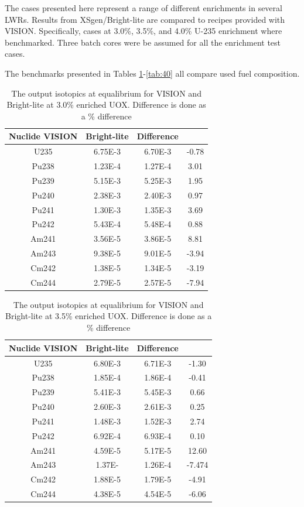 \documentclass{article}
\begin{document}
The cases presented here represent a range of different enrichments in several LWRs.
Results from XSgen/Bright-lite are compared to recipes provided with VISION\cite{vision}.
Specifically, cases at 3.0\%, 3.5\%, and 4.0\% U-235 enrichment where benchmarked.
Three batch cores were be assumed for all the enrichment test cases.

The benchmarks presented in Tables \ref{tab:30}-\ref{tab:40}
all compare used fuel composition. 

\begin{table}[!htb]
\centering
\small
\caption{The output isotopics at equalibrium for VISION and Bright-lite at 3.0\% enriched UOX. Difference is done as a \% difference}
\label{tab:30}
\vspace{0.5em}
\begin{tabular}{cccc}
Nuclide  VISION & Bright-lite & Difference \\
\hline
U235  & 6.75E-3 & 6.70E-3 & -0.78\\
Pu238 & 1.23E-4 & 1.27E-4 & 3.01\\
Pu239 & 5.15E-3 & 5.25E-3 & 1.95\\
Pu240 & 2.38E-3 & 2.40E-3 & 0.97\\
Pu241 & 1.30E-3 & 1.35E-3 & 3.69\\
Pu242 & 5.43E-4 & 5.48E-4 & 0.88\\
Am241 & 3.56E-5 & 3.86E-5 & 8.81\\
Am243 & 9.38E-5 & 9.01E-5 & -3.94\\
Cm242 & 1.38E-5 & 1.34E-5 & -3.19\\
Cm244 & 2.79E-5 & 2.57E-5 & -7.94\\
\hline
\end{tabular}
\end{table}

\begin{table}[!htb]
\centering
\small
\caption{The output isotopics at equalibrium for VISION and Bright-lite at 3.5\% enriched UOX. Difference is done as a \% difference}
\label{tab:35}
\vspace{0.5em}
\begin{tabular}{cccc}
Nuclide  VISION & Bright-lite & Difference \\
\hline
U235  & 6.80E-3 & 6.71E-3 & -1.30\\
Pu238 & 1.85E-4 & 1.86E-4 & -0.41\\
Pu239 & 5.41E-3 & 5.45E-3 & 0.66\\
Pu240 & 2.60E-3 & 2.61E-3 & 0.25 \\
Pu241 & 1.48E-3 & 1.52E-3 & 2.74\\
Pu242 & 6.92E-4 & 6.93E-4 & 0.10 \\
Am241 & 4.59E-5 & 5.17E-5 & 12.60\\
Am243 & 1.37E- & 1.26E-4 & -7.474\\
Cm242 & 1.88E-5 & 1.79E-5 & -4.91\\
Cm244 & 4.38E-5 & 4.54E-5 & -6.06\\
\hline
\end{tabular}
\end{table}
\end{document}
